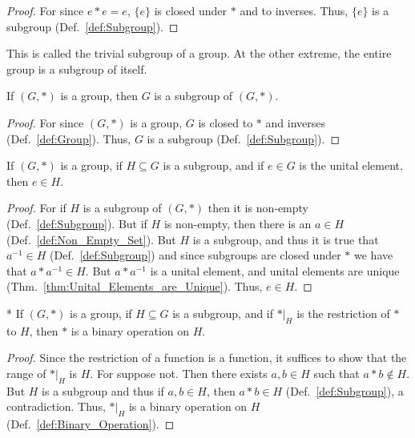         \begin{proof}
            For since $e*e=e$, $\{e\}$ is closed under $*$ and to inverses.
            Thus, $\{e\}$ is a subgroup (Def.~\ref{def:Subgroup}).
        \end{proof}
        This is called the trivial subgroup of a group. At the other extreme,
        the entire group is a subgroup of itself.
        \begin{theorem}
            If $(G,*)$ is a group, then $G$ is a subgroup of $(G,*)$.
        \end{theorem}
        \begin{proof}
            For since $(G,*)$ is a group, $G$ is closed to $*$ and inverses
            (Def.~\ref{def:Group}). Thus, $G$ is a subgroup
            (Def.~\ref{def:Subgroup}).
        \end{proof}
        \begin{theorem}
            \label{thm:Subgroup_Contains_Identity}%
            If $(G,*)$ is a group, if $H\subseteq{G}$ is a subgroup, and if
            $e\in{G}$ is the unital element, then $e\in{H}$.
        \end{theorem}
        \begin{proof}
            For if $H$ is a subgroup of $(G,*)$ then it is non-empty
            (Def.~\ref{def:Subgroup}). But if $H$ is non-empty, then there is an
            $a\in{H}$ (Def.~\ref{def:Non_Empty_Set}). But $H$ is a subgroup, and
            thus it is true that $a^{\minus{1}}\in{H}$
            (Def.~\ref{def:Subgroup}) and since subgroups are closed under $*$
            we have that $a*a^{\minus{1}}\in{H}$. But $a*a^{\minus{1}}$ is a
            unital element, and unital elements are unique
            (Thm.~\ref{thm:Unital_Elements_are_Unique}). Thus, $e\in{H}$.
        \end{proof}
        \begin{theorem}
            \label{thm:Restriction_of_bi_op_to_subgroup_is_bi_op}*
            If $(G,*)$ is a group, if $H\subseteq{G}$ is a subgroup, and if
            $*|_{H}$ is the restriction of $*$ to $H$, then $*$ is a binary
            operation on $H$.
        \end{theorem}
        \begin{proof}
            Since the restriction of a function is a function, it suffices to
            show that the range of $*|_{H}$ is $H$. For suppose not. Then there
            exists $a,b\in{H}$ such that $a*b\notin{H}$. But $H$ is a subgroup
            and thus if $a,b\in{H}$, then $a*b\in{H}$ (Def.~\ref{def:Subgroup}),
            a contradiction. Thus, $*|_{H}$ is a binary operation on $H$
            (Def.~\ref{def:Binary_Operation}).
        \end{proof}
